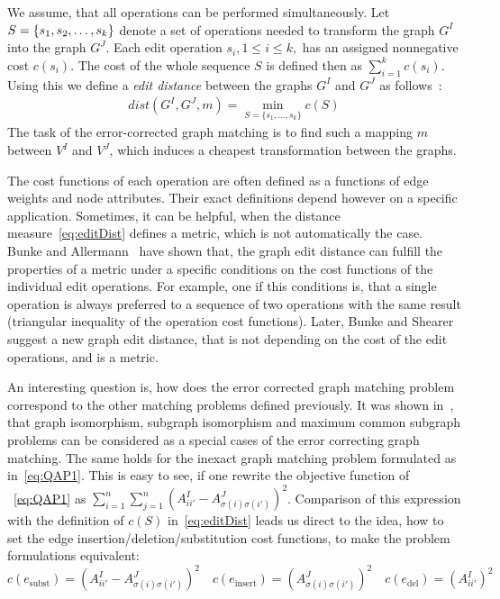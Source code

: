 We assume, that all operations can be performed simultaneously. Let $S=\{s_1,s_2,\dots,\newline s_k\}$ denote a set of operations needed to transform the graph $G^I$ into the graph $G^J$. 
Each edit operation $s_i, 1\le i\le k,$ has an assigned nonnegative cost $c(s_i)$. The cost of the whole sequence $S$ is defined then as $\sum_{i=1}^{k}c(s_i)$. Using this we define a \emph{edit distance} between the graphs $G^I$ and $G^J$ as follows~\cite{Bunke1983_inexactGM, Wang1995}:
\begin{eqnarray} \label{eq:editDist}
dist(G^I,G^J,m) = \min\limits_{S=\{s_1,\dots,s_k\}}c(S)
\end{eqnarray}
The task of the error-corrected graph matching is to find such a mapping $m$ between $V^I$ and $V^J$, which induces a cheapest transformation between the graphs.

The cost functions of each operation are often defined as a functions of edge weights and node attributes. Their exact definitions depend however on a specific application. Sometimes, it can be helpful, when the distance measure~\eqref{eq:editDist} defines a metric, which is not automatically the case. Bunke and Allermann~\cite{Bunke1983_inexactGM} have shown that, the graph edit distance can fulfill the properties of a metric under a specific conditions on the cost functions of the individual edit operations. For example, one if this conditions is, that a single operation is always preferred to a sequence of two operations with the same result (triangular inequality of the operation cost functions). Later, Bunke and Shearer~\cite{Bunke1998_graphDist} suggest a new graph edit distance, that is not depending on the cost of the edit operations, and is a metric.

An interesting question is, how does the error corrected graph matching problem correspond to the other matching problems defined previously. It was shown in~\cite{Bunke1999_UnderlyingCosts}, that graph isomorphism, subgraph isomorphism and maximum common subgraph problems can be considered as a special cases of the error correcting graph matching. The same holds for the inexact graph matching problem formulated as in~\eqref{eq:QAP1}. This is easy to see, if one rewrite the objective function of ~\eqref{eq:QAP1} as $\sum_{i=1}^n\sum_{j=1}^{n}(A^I_{ii'}-A^J_{\sigma(i)\sigma(i')})^2$. Comparison of this expression with the definition of $c(S)$ in~\eqref{eq:editDist} leads us direct to the idea, how to set the edge insertion/deletion/substitution cost functions, to make the problem formulations equivalent: 
\begin{equation*}
c(e_{\text{subst}})=(A^I_{ii'}-A^J_{\sigma(i)\sigma(i')})^2\quad c(e_{\text{insert}})=(A^J_{\sigma(i)\sigma(i')})^2\quad c(e_{\text{del}})=(A^I_{ii'})^2
\end{equation*}
